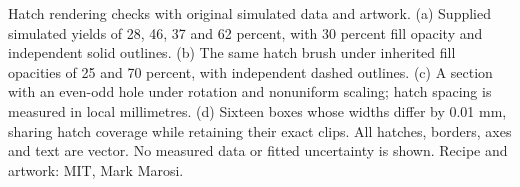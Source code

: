 \caption{Hatch rendering checks with original simulated data and artwork. (a) Supplied simulated yields of 28, 46, 37 and 62 percent, with 30 percent fill opacity and independent solid outlines. (b) The same hatch brush under inherited fill opacities of 25 and 70 percent, with independent dashed outlines. (c) A section with an even-odd hole under rotation and nonuniform scaling; hatch spacing is measured in local millimetres. (d) Sixteen boxes whose widths differ by 0.01 mm, sharing hatch coverage while retaining their exact clips. All hatches, borders, axes and text are vector. No measured data or fitted uncertainty is shown. Recipe and artwork: MIT, Mark Marosi.}
